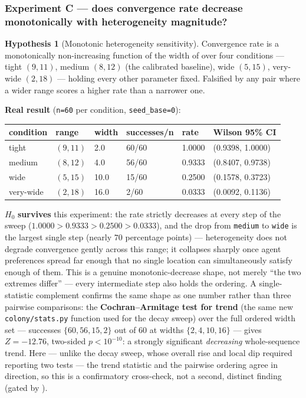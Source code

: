 \documentclass[
  english,
]{article}
\newcounter{none} %
\theoremstyle{definition}
\newtheorem{hypothesis}[theorem]{Hypothesis}
\begin{document}
\subsubsection{Experiment C --- does convergence rate decrease
monotonically with heterogeneity
magnitude?}\label{experiment-c-does-convergence-rate-decrease-monotonically-with-heterogeneity-magnitude}

\begin{hypothesis}[Monotonic heterogeneity sensitivity]
Convergence rate is a monotonically non-increasing function of the width of
 over four conditions — tight \((9, 11)\), medium \((8, 12)\) (the
calibrated baseline), wide \((5, 15)\), very-wide \((2, 18)\) — holding every other parameter fixed.
Falsified by any pair where a wider range scores a higher rate than a narrower one.
\end{hypothesis}

\textbf{Real result} (\texttt{n=60} per condition,
\texttt{seed\_base=0}):

{\def\LTcaptype{none} %
\begin{longtable}[]{@{}llllll@{}}
\toprule\noalign{}
condition & range & width & successes/n & rate & Wilson 95\% CI \\
\midrule\noalign{}
\endhead
\bottomrule\noalign{}
\endlastfoot
tight & \((9, 11)\) & 2.0 & 60/60 & 1.0000 & (0.9398, 1.0000) \\
medium & \((8, 12)\) & 4.0 & 56/60 & 0.9333 & (0.8407, 0.9738) \\
wide & \((5, 15)\) & 10.0 & 15/60 & 0.2500 & (0.1578, 0.3723) \\
very-wide & \((2, 18)\) & 16.0 & 2/60 & 0.0333 & (0.0092, 0.1136) \\
\end{longtable}
}

\(H_0\) \textbf{survives} this experiment: the rate strictly decreases
at every step of the sweep (\(1.0000 > 0.9333 > 0.2500 > 0.0333\)), and
the drop from \texttt{medium} to \texttt{wide} is the largest single
step (nearly \(70\) percentage points) --- heterogeneity does not
degrade convergence gently across this range; it collapses sharply once
agent preferences spread far enough that no single location can
simultaneously satisfy enough of them. This is a genuine
monotonic-decrease shape, not merely ``the two extremes differ'' ---
every intermediate step also holds the ordering. A single-statistic
complement confirms the same shape as one number rather than three
pairwise comparisons: the \textbf{Cochran--Armitage test for trend} (the
same new \texttt{colony/stats.py} function used for the decay sweep)
over the full ordered width set --- successes \(\{60, 56, 15, 2\}\) out
of \(60\) at widths \(\{2, 4, 10, 16\}\) --- gives \(Z = -12.76\),
two-sided \(p < 10^{-10}\): a strongly significant \emph{decreasing}
whole-sequence trend. Here --- unlike the decay sweep, whose overall
rise and local dip required reporting two tests --- the trend statistic
and the pairwise ordering agree in direction, so this is a confirmatory
cross-check, not a second, distinct finding (gated by
).
\end{document}
